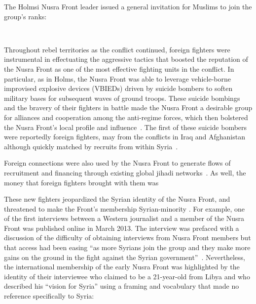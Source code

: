 The Holmsi Nusra Front leader issued a general invitation for Muslims to join the group’s ranks:

~\autocite{sherlock2012inside}


Throughout rebel territories as the conflict continued,  foreign fighters were instrumental in effectuating the aggressive tactics that boosted the reputation of the Nusra Front as one of the most effective fighting units in the conflict. In particular, as in Holms, the Nusra Front was able to leverage vehicle-borne improvised explosive devices (VBIEDs) driven by suicide bombers to soften military bases for subsequent waves of ground troops. These suicide bombings and the bravery of their fighters in battle made the Nusra Front a desirable group for alliances and cooperation among the anti-regime forces, which then bolstered the Nusra Front’s local profile and influence~\autocite{lister2016profiling}.  The first of these suicide bombers were reportedly foreign fighters, may from the conflicts in Iraq and Afghanistan although quickly matched by recruits from within Syria~\autocite{ignatius2012affiliate, sherlock2012inside}. 

Foreign connections were also used by the Nusra Front to generate flows of recruitment and financing through existing global jihadi networks~\autocite{sherlock2012inside}. As well, the money that foreign fighters brought with them was 


These new fighters jeopardized the Syrian identity of the Nusra Front, and threatened to make the Front’s membership Syrian-minority \autocite{adraoui2019case}.  For example, one of the first interviews between  a Western journalist and a member of the Nusra Front was published online in March 2013. The interview was prefaced with a discussion of the difficulty of obtaining interviews from Nusra Front members but that access had been easing “as more Syrians join the group and they make more gains on the ground in the fight against the Syrian government”~\autocite{marrouch2013nusra}. Nevertheless, the international membership of the early Nusra Front was highlighted by the identity of their interviewee who claimed to be a 21-year-old from Libya and who described his “vision for Syria” using a framing and vocabulary that made no reference specifically to Syria:

